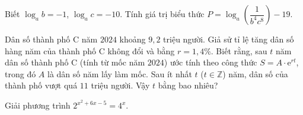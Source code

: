 \begin{bt}%
	 			Biết $\log_a b = -1$, $\log_a c = -10$. Tính giá trị biểu thức $P = \log_a \left( \dfrac{1}{b^4 c^8} \right) - 19$.
	 	\end{bt}

\begin{bt}%
	Dân số thành phố C năm $2024$ khoảng $9{,}2$ triệu người. Giả sử tỉ lệ tăng dân số hàng năm của thành phố C không đổi và bằng $r=1{,}4\%$. Biết rằng, sau $t$ năm dân số thành phố C (tính từ mốc năm $2024$) ước tính theo công thức $S=A\cdot \mathrm{e}^{rt}$, trong đó $A$ là dân số năm lấy làm mốc. Sau ít nhất $t$ ($t\in \mathbb{Z}$) năm, dân số của thành phố vượt quá $11$ triệu người. Vậy $t$ bằng bao nhiêu?
\end{bt}

\begin{bt}%
	Giải phương trình $2^{x^2+6x-5}=4^x$.
\end{bt}

